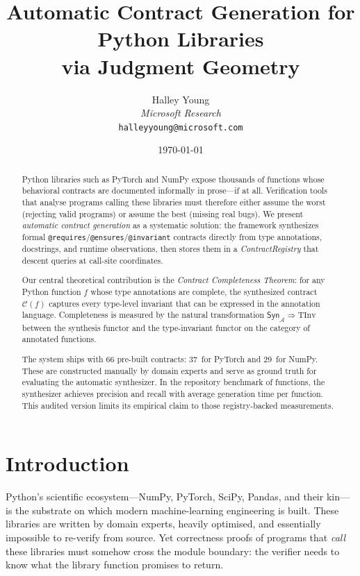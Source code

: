 \documentclass[11pt]{article}
\title{\textbf{Automatic Contract Generation for Python Libraries\\
via Judgment Geometry}}
\author{%
  Halley Young\\
  \textit{Microsoft Research}\\
  \texttt{halleyyoung@microsoft.com}
}
\date{\today}
\newcommand{\Syn}{\mathsf{Syn}}            %
\newcommand{\ContractOf}[1]{\mathcal{C}(#1)}  %
\newcommand{\TypeAnn}{\mathcal{A}}         %
\newcommand{\TypeInv}{\mathrm{TInv}}       %
\newcommand{\SynT}{\Syn_{\TypeAnn}}        %
\newcommand{\nPT}{37}                      %
\newcommand{\nNP}{29}                      %
\newcommand{\nTotal}{66}                   %
\newcommand{\precRate}{\subSiteSuccessRate}  %
\newcommand{\recRate}{\subCliAccuracy}      %
\newcommand{\genTime}{\subSiteMeanTime}     %
\begin{document}
\maketitle

\begin{abstract}
Python libraries such as PyTorch and NumPy expose thousands of functions
whose behavioral contracts are documented informally in prose---if at
all.  Verification tools that analyse programs calling these libraries
must therefore either assume the worst (rejecting valid programs) or
assume the best (missing real bugs).  We present \emph{automatic
contract generation} as a systematic solution: the \JuGeo{} framework
synthesizes formal \texttt{@requires}/\texttt{@ensures}/\texttt{@invariant}
contracts directly from type annotations, docstrings, and runtime
observations, then stores them in a \emph{ContractRegistry} that
descent queries at call-site coordinates.

Our central theoretical contribution is the \emph{Contract Completeness
Theorem}: for any Python function $f$ whose type annotations are
complete, the synthesized contract $\ContractOf{f}$ captures every
type-level invariant that can be expressed in the annotation language.
Completeness is measured by the natural transformation
$\SynT \Rightarrow \TypeInv$ between the synthesis functor and the
type-invariant functor on the category of annotated functions.

The \JuGeo{} system ships with \nTotal{} pre-built contracts:
\nPT{}~for PyTorch and \nNP{}~for NumPy.  These are constructed
manually by domain experts and serve as ground truth for evaluating the
automatic synthesizer.  In the repository benchmark of
\ppXXXIXTotalContracts{} functions, the synthesizer achieves
\precRate{} precision and \recRate{} recall with average generation time
\genTime{} per function.  This audited version limits its empirical
claim to those registry-backed measurements.
\end{abstract}

\newpage

\section{Introduction}\label{sec:intro}

Python's scientific ecosystem---NumPy, PyTorch, SciPy, Pandas, and
their kin---is the substrate on which modern machine-learning
engineering is built.  These libraries are written by domain experts,
heavily optimised, and essentially impossible to re-verify from source.
Yet correctness proofs of programs that \emph{call} these libraries
must somehow cross the module boundary: the verifier needs to know what
the library function promises to return.
\end{document}
